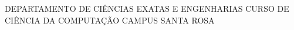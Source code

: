 \renewcommand{\folhaderostocontent} {
    \begin{center}
      {\ABNTEXsubsectionfont\large \imprimirinstituicao} \linebreak
      {\ABNTEXsubsectionfont\large DEPARTAMENTO DE CIÊNCIAS EXATAS E ENGENHARIAS} \linebreak
      {\ABNTEXsubsectionfont\large CURSO DE CIÊNCIA DA COMPUTAÇÃO} \linebreak
      {\ABNTEXsubsectionfont\large CAMPUS SANTA ROSA}
    \end{center}  
    \vspace*{3cm}
    \begin{center}
      \vspace*{\fill}
      \begin{center}
      \ABNTEXchapterfont\bfseries\Large\imprimirtitulo
      \end{center}
      \vspace*{\fill}
      \vspace*{3cm}
      \abntex@ifnotempty{\imprimirpreambulo}{%
        \hspace{.45\textwidth}
        \begin{minipage}{.5\textwidth}
        \SingleSpacing
        \imprimirpreambulo
        \end{minipage}
        \vspace*{\fill}
      }
    
      \abntex@ifnotempty{\imprimirorientador}{%
      \hspace{.45\textwidth}
      \begin{minipage}{.5\textwidth}
    	{\imprimirorientadorRotulo~\imprimirorientador}%
      \end{minipage}
      }
      
      \vspace*{3cm}
      
      \vspace*{\fill}
      {\large\imprimirlocal}
      \par
      {\large\the\year}
      \vspace*{1cm}
    \end{center}
}


\makeatother

\folhaderostocontent



% 	
%     
%  

